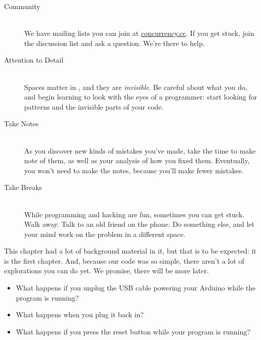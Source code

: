 \begin{description}
	\item[Community]\ \\ We have mailing lists you can join at \url{concurrency.cc}. If you get stuck, join the discussion list and ask a question. We're there to help.
	\item[Attention to Detail]\ \\ Spaces matter in \plumbing, and they are {\em invisible}. Be careful about what you do, and begin learning to look with the eyes of a programmer: start looking for patterns and the invisible parts of your code.
	\item[Take Notes]\ \\ As you discover new kinds of mistakes you've made, take the time to make note of them, as well as your analysis of how you fixed them. Eventually, you won't need to make the notes, because you'll make fewer mistakes.
	\item[Take Breaks]\ \\ While programming and hacking are fun, sometimes you can get stuck. Walk away. Talk to an old friend on the phone. Do something else, and let your mind work on the problem in a different space.
\end{description}

\EXPLORATIONS
This chapter had a lot of background material in it, but that is to be expected: it is the first chapter. And, because our code was so simple, there aren't a lot of explorations you can do yet. We promise, there will be more later.

\begin{itemize}
	\item What happens if you unplug the USB cable powering your Arduino while the program is running? 
	\item What happens when you plug it back in?
	\item What happens if you press the reset button while your program is running?
\end{itemize}